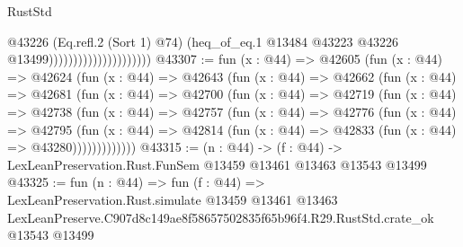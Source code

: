 \begin{lexlean}{RustStd}
\begin{coremodule}
                                            @43226
                                            (Eq.refl.{2} (Sort 1) @74)
                                            (heq_of_eq.{1}
                                              @13484
                                              @43223
                                              @43226
                                              @13499)))))))))))))))))))))
@43307 := fun (x : @44) =>
  @42605
    (fun (x : @44) =>
    @42624
      (fun (x : @44) =>
      @42643
        (fun (x : @44) =>
        @42662
          (fun (x : @44) =>
          @42681
            (fun (x : @44) =>
            @42700
              (fun (x : @44) =>
              @42719
                (fun (x : @44) =>
                @42738
                  (fun (x : @44) =>
                  @42757
                    (fun (x : @44) =>
                    @42776
                      (fun (x : @44) =>
                      @42795
                        (fun (x : @44) =>
                        @42814 (fun (x : @44) => @42833 (fun (x : @44) => @43280)))))))))))))
@43315 := (n : @44) ->
  (f : @44) -> LexLeanPreservation.Rust.FunSem @13459 @13461 @13463 @13543 @13499
@43325 := fun (n : @44) =>
  fun (f : @44) =>
  LexLeanPreservation.Rust.simulate
    @13459
    @13461
    @13463
    LexLeanPreserve.C907d8c149ae8f58657502835f65b96f4.R29.RustStd.crate_ok
    @13543
    @13499
\end{coremodule}
\end{lexlean}
